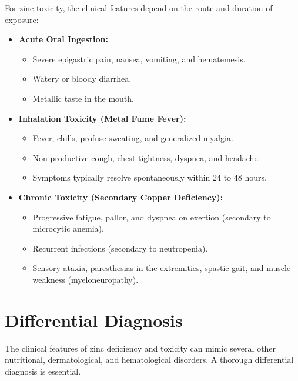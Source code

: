 For zinc toxicity, the clinical features depend on the route and duration of exposure:
\begin{itemize}
    \item \textbf{Acute Oral Ingestion:}
    \begin{itemize}
        \item Severe epigastric pain, nausea, vomiting, and hematemesis.
        \item Watery or bloody diarrhea.
        \item Metallic taste in the mouth.
    \end{itemize}
    \item \textbf{Inhalation Toxicity (Metal Fume Fever):}
    \begin{itemize}
        \item Fever, chills, profuse sweating, and generalized myalgia.
        \item Non-productive cough, chest tightness, dyspnea, and headache.
        \item Symptoms typically resolve spontaneously within 24 to 48 hours.
    \end{itemize}
    \item \textbf{Chronic Toxicity (Secondary Copper Deficiency):}
    \begin{itemize}
        \item Progressive fatigue, pallor, and dyspnea on exertion (secondary to microcytic anemia).
        \item Recurrent infections (secondary to neutropenia).
        \item Sensory ataxia, paresthesias in the extremities, spastic gait, and muscle weakness (myeloneuropathy).
    \end{itemize}
\end{itemize}

\section*{Differential Diagnosis}
The clinical features of zinc deficiency and toxicity can mimic several other nutritional, dermatological, and hematological disorders. A thorough differential diagnosis is essential.

